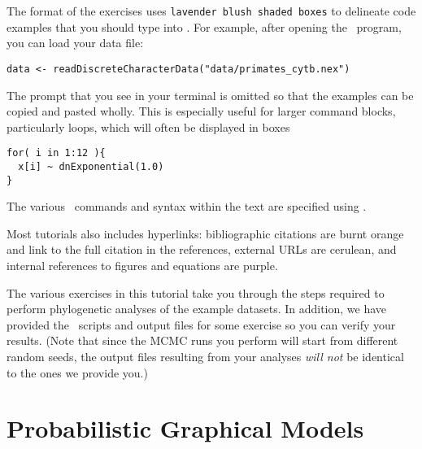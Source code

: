 The format of the exercises uses \colorbox{shadecolor}{\tt lavender blush shaded boxes} to delineate code examples that you should type into \RevBayes. 
For example, after opening the \RevBayes~program, you can load your data file:
{\tt \begin{snugshade*}
\begin{lstlisting}
data <- readDiscreteCharacterData("data/primates_cytb.nex")
\end{lstlisting}
\end{snugshade*}}

The  prompt that you see in your terminal is omitted so that the examples can be copied and pasted wholly. 
This is especially useful for larger command blocks, particularly loops, which will often be displayed in boxes
{\tt \begin{snugshade*}
\begin{lstlisting}
for( i in 1:12 ){
  x[i] ~ dnExponential(1.0)
}
\end{lstlisting}
\end{snugshade*}}

The various \RevBayes~commands and syntax within the text are specified using . 

Most tutorials also includes hyperlinks: bibliographic citations are {\textcolor{citescol}{burnt orange}} and link to the full citation in the references, external URLs are {\textcolor{urlscol}{cerulean}}, and internal references to figures and equations are {\textcolor{linkscol}{purple}}.

The various exercises in this tutorial take you through the steps required to perform phylogenetic analyses of the example datasets. 
In addition, we have provided the \Rev~scripts and output files for some exercise so you can verify your results. (Note that since the MCMC runs you perform will start from different random seeds, the output files resulting from your analyses \textit{will not} be identical to the ones we provide you.)


\bigskip
\section{Probabilistic Graphical Models}

